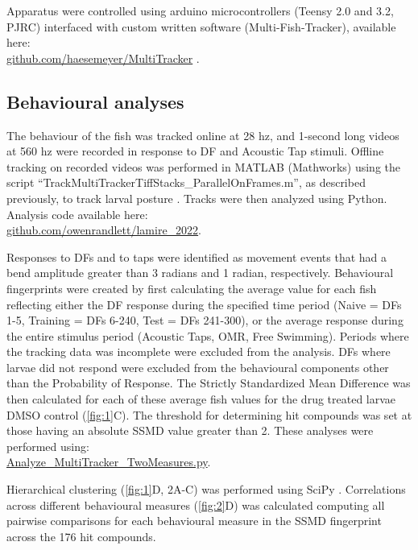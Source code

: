 \documentclass[9pt,lineno]{RandlettLab_elife}
\begin{document}
Apparatus were controlled using arduino microcontrollers (Teensy 2.0 and 3.2, PJRC) interfaced with custom written software (Multi-Fish-Tracker), available here: \\
\href{https://github.com/haesemeyer/MultiTracker}{github.com/haesemeyer/MultiTracker} . 

\subsection{Behavioural analyses}

The behaviour of the fish was tracked online at 28 hz, and 1-second long videos at 560 hz were recorded in response to DF and Acoustic Tap stimuli. Offline tracking on recorded videos was performed in MATLAB (Mathworks) using the script “TrackMultiTrackerTiffStacks\_ParallelOnFrames.m”, as described previously, to track larval posture \cite{Randlett2019-fi}. Tracks were then analyzed using Python. Analysis code available here: \\
\href{https://github.com/owenrandlett/lamire_2022}{github.com/owenrandlett/lamire\_2022}.

Responses to DFs and to taps were identified as movement events that had a bend amplitude greater than 3 radians and 1 radian, respectively. Behavioural fingerprints were created by first calculating the average value for each fish reflecting either the DF response during the specified time period (Naive = DFs 1-5, Training = DFs 6-240, Test = DFs 241-300), or the average response during the entire stimulus period (Acoustic Taps, OMR, Free Swimming). Periods where the tracking data was incomplete were excluded from the analysis. DFs where larvae did not respond were excluded from the behavioural components other than the Probability of Response. The Strictly Standardized Mean Difference was then calculated for each of these average fish values for the drug treated larvae DMSO control (\autoref{fig:1}C). The threshold for determining hit compounds was set at those having an absolute SSMD value greater than 2. These analyses were performed using: 
\\ \href{https://github.com/owenrandlett/lamire_2022/blob/main/Analyze_MultiTracker_TwoMeasures.py}{Analyze\_MultiTracker\_TwoMeasures.py}. 

Hierarchical clustering (\autoref{fig:1}D, 2A-C) was performed using SciPy \cite{Virtanen2020-sz}. Correlations across different behavioural measures (\autoref{fig:2}D) was calculated computing all pairwise comparisons for each behavioural measure in the SSMD fingerprint across the 176 hit compounds. 
\end{document}
